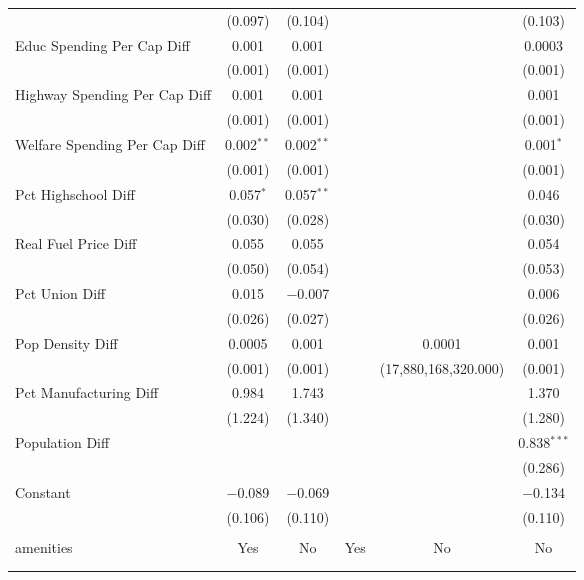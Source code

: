 \begin{table}[!htbp]
\begin{tabular}{@{\extracolsep{5pt}}lccccc}
  & (0.097) & (0.104) &  &  & (0.103) \\ 
  Educ Spending Per Cap Diff & 0.001 & 0.001 &  &  & 0.0003 \\ 
  & (0.001) & (0.001) &  &  & (0.001) \\ 
  Highway Spending Per Cap Diff & 0.001 & 0.001 &  &  & 0.001 \\ 
  & (0.001) & (0.001) &  &  & (0.001) \\ 
  Welfare Spending Per Cap Diff & 0.002$^{**}$ & 0.002$^{**}$ &  &  & 0.001$^{*}$ \\ 
  & (0.001) & (0.001) &  &  & (0.001) \\ 
  Pct Highschool Diff & 0.057$^{*}$ & 0.057$^{**}$ &  &  & 0.046 \\ 
  & (0.030) & (0.028) &  &  & (0.030) \\ 
  Real Fuel Price Diff & 0.055 & 0.055 &  &  & 0.054 \\ 
  & (0.050) & (0.054) &  &  & (0.053) \\ 
  Pct Union Diff & 0.015 & $-$0.007 &  &  & 0.006 \\ 
  & (0.026) & (0.027) &  &  & (0.026) \\ 
  Pop Density Diff & 0.0005 & 0.001 &  & 0.0001 & 0.001 \\ 
  & (0.001) & (0.001) &  & (17,880,168,320.000) & (0.001) \\ 
  Pct Manufacturing Diff & 0.984 & 1.743 &  &  & 1.370 \\ 
  & (1.224) & (1.340) &  &  & (1.280) \\ 
  Population Diff &  &  &  &  & 0.838$^{***}$ \\ 
  &  &  &  &  & (0.286) \\ 
  Constant & $-$0.089 & $-$0.069 &  &  & $-$0.134 \\ 
  & (0.106) & (0.110) &  &  & (0.110) \\ 
 \hline \\[-1.8ex] 
amenities & Yes & No & Yes & No & No \\ 
\hline \\[-1.8ex] 
\hline 
\hline \\[-1.8ex] 
\end{tabular} 
\end{table} 
